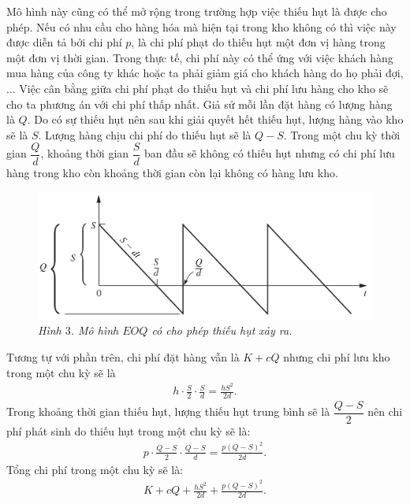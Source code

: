 \begin{multicols}{2}
	Mô hình này cũng có thể mở rộng trong trường hợp việc thiếu hụt là được cho phép. Nếu có nhu cầu cho hàng hóa mà hiện tại trong kho không có thì việc này được diễn tả bởi chi phí $p$, là chi phí phạt do thiếu hụt một đơn vị hàng trong một đơn vị thời gian. Trong thực tế, chi phí này có thể ứng với việc khách hàng mua hàng của công ty khác hoặc ta phải giảm giá cho khách hàng do họ phải đợi, ... Việc cân bằng giữa chi phí phạt do thiếu hụt và chi phí lưu hàng cho kho sẽ cho ta phương án với chi phí thấp nhất.
	\vskip 0.1cm
	Giả sử mỗi lần đặt hàng có lượng hàng là $Q$. Do có sự thiếu hụt nên sau khi giải quyết hết thiếu hụt, lượng hàng vào kho sẽ là $S$. Lượng hàng chịu chi phí do thiếu hụt sẽ là $Q-S$. Trong một chu kỳ thời gian $\dfrac{Q}{d}$, khoảng thời gian $\dfrac{S}{d}$ ban đầu sẽ không có thiếu hụt nhưng có chi phí lưu hàng trong kho còn khoảng thời gian còn lại không có hàng lưu kho.
	\begin{figure}[H]
		\vspace*{-5pt}
		\centering
		\captionsetup{labelformat= empty, justification=centering}
		\includegraphics[width= 1\linewidth]{4}
		\caption{\small\textit{\color{toanhocdoisong}Hình $3$. Mô hình $EOQ$ có cho phép thiếu hụt xảy ra.}}
		\vspace*{-10pt}
	\end{figure}
	Tương tự với phần trên, chi phí đặt hàng vẫn là $K+cQ$ nhưng chi phí lưu kho trong một chu kỳ sẽ là
	\begin{align*}
		h\cdot\frac{S}{2}\cdot\frac{S}{d} = \frac{hS^2}{2d}.
	\end{align*}
	Trong khoảng thời gian thiếu hụt, lượng thiếu hụt trung bình sẽ là $\dfrac{Q-S}{2}$ nên chi phí phát sinh do thiếu hụt trong một chu kỳ sẽ là:
	\begin{align*}
		p\cdot\frac{Q-S}{2}\cdot\frac{Q-S}{d} = \frac{p(Q-S)^2}{2d}.
	\end{align*}
	Tổng chi phí trong một chu kỳ sẽ là:
	\begin{align*}
		K + cQ + \frac{hS^2}{2d} + \frac{p(Q-S)^2}{2d}.
	\end{align*}

\end{multicols}
